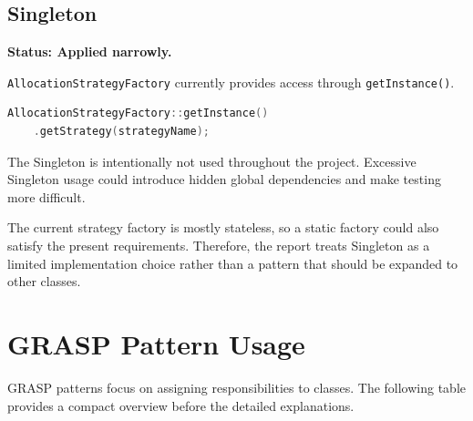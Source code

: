 \documentclass[12pt,a4paper]{article}
\begin{document}
\subsection{Singleton}

\textbf{Status: Applied narrowly.}

\texttt{AllocationStrategyFactory} currently provides access through
\texttt{getInstance()}.

\begin{lstlisting}[language=C++]
AllocationStrategyFactory::getInstance()
    .getStrategy(strategyName);
\end{lstlisting}

The Singleton is intentionally not used throughout the project. Excessive
Singleton usage could introduce hidden global dependencies and make testing
more difficult.

The current strategy factory is mostly stateless, so a static factory could
also satisfy the present requirements. Therefore, the report treats Singleton
as a limited implementation choice rather than a pattern that should be
expanded to other classes.

\section{GRASP Pattern Usage}

GRASP patterns focus on assigning responsibilities to classes. The following
table provides a compact overview before the detailed explanations.
\end{document}
